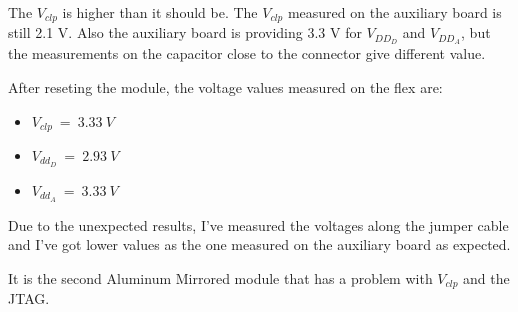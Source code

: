 \documentclass[a4papper, 10pt]{article}
\begin{document}
     The $V_{clp}$ is higher than it should be.
     The $V_{clp}$ measured on the auxiliary board is still 2.1 V.
     Also the auxiliary board is providing 3.3 V for $V_{DD_D}$ and $V_{DD_A}$, but the measurements on the capacitor close to the connector give different value.

     After reseting the module, the voltage values measured on the flex are:
     
     \begin{itemize}
       \item $V_{clp} \ = \ 3.33 \ V$ 
       \item $V_{dd_D} \ = \ 2.93 \ V$
       \item $V_{dd_A} \ = \ 3.33 \ V$
     \end{itemize}
        
    Due to the unexpected results, I've measured the voltages along the jumper cable and I've got lower values as the one measured on the auxiliary board as expected.

    It is the second Aluminum Mirrored module that has a problem with $V_{clp}$ and the JTAG.

 
\end{document}
